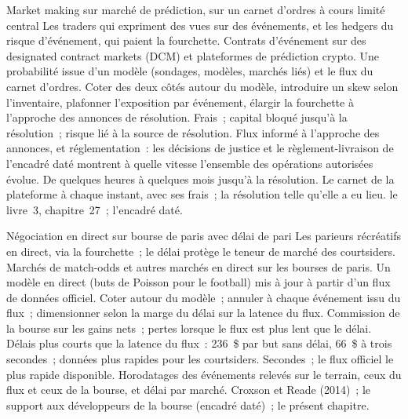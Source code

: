 \begin{strategyfile}{Market making sur marché de prédiction, sur un carnet d'ordres à cours limité central}\label{strat:hf:prediction-and-sports-market-making:clob}
 Les traders qui expriment des vues sur des événements, et les hedgers du risque d'événement, qui paient la fourchette.
 Contrats d'événement sur des designated contract markets (DCM) et plateformes de prédiction crypto.
 Une probabilité issue d'un modèle (sondages, modèles, marchés liés) et le flux du carnet d'ordres.
 Coter des deux côtés autour du modèle, introduire un skew selon l'inventaire, plafonner l'exposition par événement, élargir la fourchette à l'approche des annonces de résolution.
 Frais~; capital bloqué jusqu'à la résolution~; risque lié à la source de résolution.
 Flux informé à l'approche des annonces, et réglementation~: les décisions de justice et le règlement-livraison de l'encadré daté montrent à quelle vitesse l'ensemble des opérations autorisées évolue.
 De quelques heures à quelques mois jusqu'à la résolution.
 Le carnet de la plateforme à chaque instant, avec ses frais~; la résolution telle qu'elle a eu lieu.
 le livre~3, chapitre~27~; l'encadré daté.
\end{strategyfile}

\begin{strategyfile}{Négociation en direct sur bourse de paris avec délai de pari}\label{strat:hf:prediction-and-sports-market-making:inplay}
 Les parieurs récréatifs en direct, via la fourchette~; le délai protège le teneur de marché des courtsiders.
 Marchés de match-odds et autres marchés en direct sur les bourses de paris.
 Un modèle en direct (buts de Poisson pour le football) mis à jour à partir d'un flux de données officiel.
 Coter autour du modèle~; annuler à chaque événement issu du flux~; dimensionner selon la marge du délai sur la latence du flux.
 Commission de la bourse sur les gains nets~; pertes lorsque le flux est plus lent que le délai.
 Délais plus courts que la latence du flux~: 236~\$ par but sans délai, 66~\$ à trois secondes~; données plus rapides pour les courtsiders.
 Secondes~; le flux officiel le plus rapide disponible.
 Horodatages des événements relevés sur le terrain, ceux du flux et ceux de la bourse, et délai par marché.
 Croxson et Reade (2014)~; le support aux développeurs de la bourse (encadré daté)~; le présent chapitre.
\end{strategyfile}

